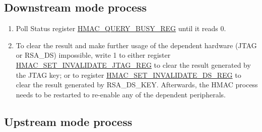 \documentclass[main\_\_EN.tex]{subfiles}
\begin{document}
\subsection{Downstream mode process}
\label{sec:hmac-downstream-process}

    \begin{enumerate}
        \item Poll Status register \hyperref[regdesc:HMACQUERYBUSYREG]{HMAC\_QUERY\_BUSY\_REG} until it reads 0.
        \item To clear the result and make further usage of the dependent hardware (JTAG or RSA\_DS) impossible, write 1 to either register \hyperref[regdesc:HMACSETINVALIDATEJTAGREG]{HMAC\_SET\_INVALIDATE\_JTAG\_REG} to clear the result generated by the JTAG key; or to register \hyperref[regdesc:HMACSETINVALIDATEDSREG]{HMAC\_SET\_INVALIDATE\_DS\_REG} to clear the result generated by RSA\_DS\_KEY. Afterwards, the HMAC process needs to be restarted to re-enable any of the dependent peripherals.
    \end{enumerate}

\subsection{Upstream mode process}
\label{sec:hmac-upstream-process}
\end{document}
